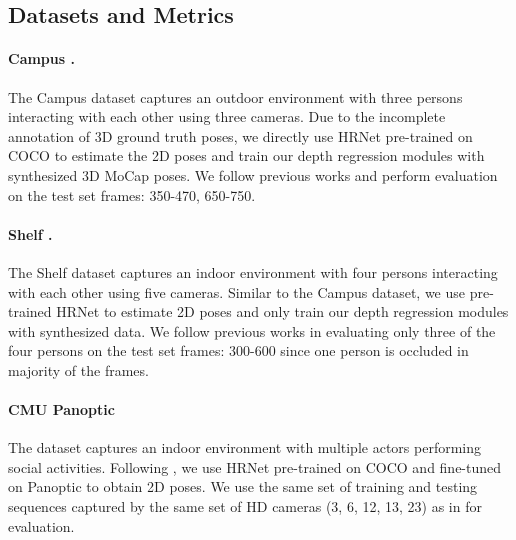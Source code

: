 \documentclass[final]{cvpr}
\begin{document}
\subsection{Datasets and Metrics}

\paragraph{Campus \cite{belagiannis20143d}.}
The Campus dataset captures an outdoor environment with three persons interacting with each other using three cameras.
Due to the incomplete annotation of 3D ground truth poses, we directly use HRNet \cite{sun2019deep} pre-trained on COCO \cite{lin2014microsoft} to estimate the 2D poses and train our depth regression modules with synthesized 3D MoCap poses.
We follow previous works \cite{dong2019fast,tu2020voxelpose,huang2020end} and perform evaluation on the test set frames: 350-470, 650-750.

\vspace{-3mm} \paragraph{Shelf \cite{belagiannis20143d}.}
The Shelf dataset captures an indoor environment with four persons interacting with each other using five cameras.
Similar to the Campus dataset, we use pre-trained HRNet to estimate 2D poses and only train our depth regression modules with synthesized data.
We follow previous works \cite{dong2019fast,tu2020voxelpose,huang2020end} in evaluating only three of the four persons on the test set frames: 300-600 since one person is occluded in majority of the frames.

\vspace{-3mm}\paragraph{CMU Panoptic \cite{joo2017panoptic}}
The dataset captures an indoor environment with multiple actors performing social activities.
Following \cite{tu2020voxelpose}, we use HRNet pre-trained on COCO and fine-tuned on Panoptic to obtain 2D poses.
We use the same set of training and testing sequences captured by the same set of HD cameras (3, 6, 12, 13, 23) as in \cite{tu2020voxelpose} for evaluation.
\end{document}
